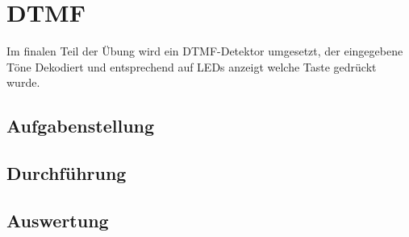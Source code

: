 \chapter{DTMF}\label{CDTMF}
Im finalen Teil der Übung wird ein DTMF-Detektor umgesetzt, der eingegebene Töne Dekodiert und entsprechend auf LEDs anzeigt welche Taste gedrückt wurde.
\section{Aufgabenstellung}\label{TDTMF}

\section{Durchführung}\label{DDTMF}
\section{Auswertung}
